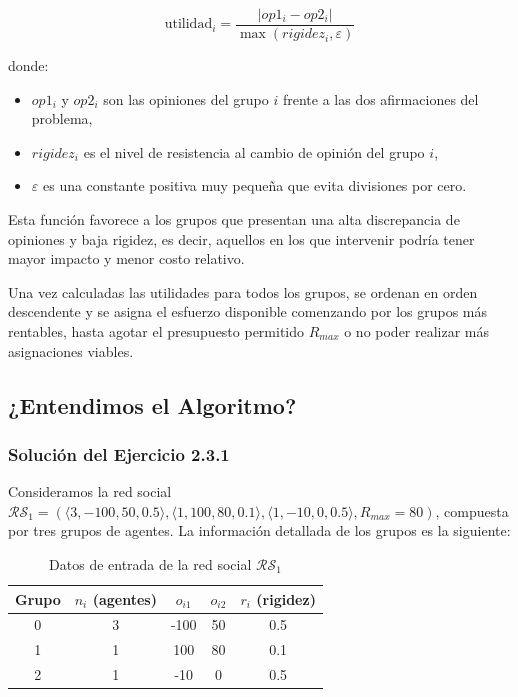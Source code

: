 \documentclass[11pt,letter]{article}
\begin{document}
\[
\text{utilidad}_i = \frac{|op1_i - op2_i|}{\max(rigidez_i, \varepsilon)}
\]

donde:
\begin{itemize}
    \item $op1_i$ y $op2_i$ son las opiniones del grupo $i$ frente a las dos afirmaciones del problema,
    \item $rigidez_i$ es el nivel de resistencia al cambio de opinión del grupo $i$,
    \item $\varepsilon$ es una constante positiva muy pequeña que evita divisiones por cero.
\end{itemize}

Esta función favorece a los grupos que presentan una alta discrepancia de opiniones y baja rigidez, es decir, aquellos en los que intervenir podría tener mayor impacto y menor costo relativo.

Una vez calculadas las utilidades para todos los grupos, se ordenan en orden descendente y se asigna el esfuerzo disponible comenzando por los grupos más rentables, hasta agotar el presupuesto permitido $R_{max}$ o no poder realizar más asignaciones viables.

\subsection{¿Entendimos el Algoritmo?}
\subsubsection{Solución del Ejercicio 2.3.1}

Consideramos la red social $\mathcal{RS}_1 = ( \langle 3, -100, 50, 0.5 \rangle, \langle 1, 100, 80, 0.1 \rangle, \langle 1, -10, 0, 0.5 \rangle, R_{max} = 80 )$, compuesta por tres grupos de agentes. La información detallada de los grupos es la siguiente:

\begin{table}[H]
\centering
\begin{tabular}{c|c|c|c|c}
\textbf{Grupo} & $n_i$ (agentes) & $o_{i1}$ & $o_{i2}$ & $r_i $ (rigidez) \\
\hline
0 & 3 & -100 & 50 & 0.5 \\
1 & 1 & 100 & 80 & 0.1 \\
2 & 1 & -10 & 0 & 0.5 \\
\end{tabular}
\caption{Datos de entrada de la red social $\mathcal{RS}_1$}
\end{table}
\end{document}
